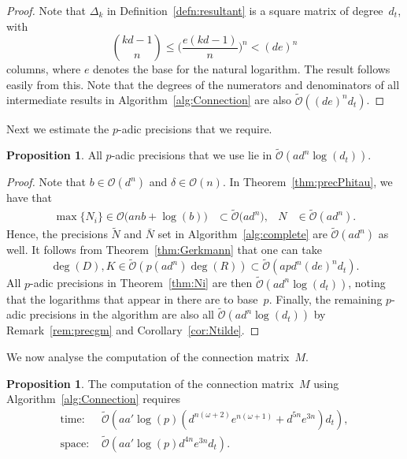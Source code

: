 \documentclass[a4paper,11pt]{article}
\numberwithin{equation}{section}
\providecommand{\BigOh}{\mathcal{O}}          %
\providecommand{\SoftOh}{\tilde{\mathcal{O}}} %
\theoremstyle{definition}
\newtheorem{prop}[thm]{Proposition}
\begin{document}
\begin{proof}
Note that $\Delta_k$ in Definition~\ref{defn:resultant} is a square matrix 
of degree~$d_t$, with
\[
{kd-1 \choose n} \leq \biggl( \frac{e(kd-1)}{n} \biggr)^n < (de)^n
\]
columns, where $e$ denotes the base for the natural logarithm. The result 
follows easily from this. Note that the degrees of the numerators and 
denominators of all intermediate results in Algorithm~\ref{alg:Connection} 
are also $\SoftOh((de)^n d_t)$.
\end{proof}

Next we estimate the $p$-adic precisions that we require.

\begin{prop}
All $p$-adic precisions that we use lie in $\SoftOh(a d^n \log(d_t))$.
\end{prop}

\begin{proof}
Note that $b \in \BigOh(d^n)$ and $\delta \in \BigOh(n)$.  
In Theorem~\ref{thm:precPhitau}, we have that
\begin{align*}
\max\{N_i\} \in \BigOh\bigl(a n b + \log(b) \bigr) 
            &\subset \SoftOh\bigl(a d^n \bigr),
&N          &\in \SoftOh(a d^n).
\end{align*}
Hence, the precisions $\tilde{N}$ and $\bar{N}$ set in 
Algorithm~\ref{alg:complete} are $\SoftOh(ad^n)$ as well.
It follows from Theorem~\ref{thm:Gerkmann} that 
one can take 
\[
\deg(D), K \in \SoftOh(p (ad^n) \deg(R)) \subset  \SoftOh(apd^n (de)^n d_t).
\] 
All $p$-adic precisions in
Theorem~\ref{thm:Ni} are then $\SoftOh(ad^n \log(d_t))$,
noting that the logarithms that appear in there are 
to base~$p$.
Finally, the remaining $p$-adic precisions in the algorithm 
are also all $\SoftOh(a d^n \log(d_t))$ by Remark~\ref{rem:precgm} 
and Corollary~\ref{cor:Ntilde}.
\end{proof}

We now analyse the computation of the connection matrix~$M$.
\begin{prop}
The computation of the connection matrix~$M$ using 
Algorithm~\ref{alg:Connection} requires
\begin{align*}
\mbox{time: }  &\SoftOh(a a' \log(p) (d^{n(\omega+2)} e^{n(\omega+1)}+ d^{5n}e^{3n} ) d_t), \\
\mbox{space: } &\SoftOh(a a' \log(p) d^{4n}e^{3n} d_t).
\end{align*}
\end{prop}
\end{document}
